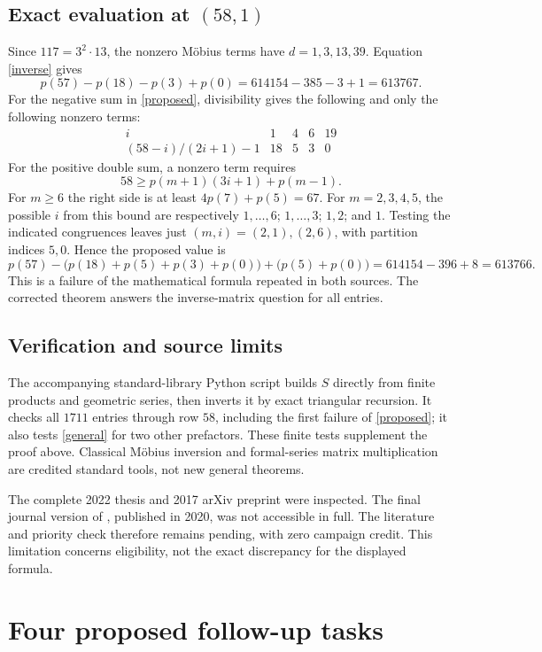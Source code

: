 \documentclass[11pt]{article}
\begin{document}
\subsection*{Exact evaluation at $(58,1)$}
Since $117=3^2\cdot13$, the nonzero M\"obius terms have
$d=1,3,13,39$. Equation \eqref{inverse} gives
\[
 p(57)-p(18)-p(3)+p(0)
 =614154-385-3+1=613767.
\]
For the negative sum in \eqref{proposed}, divisibility gives the following
and only the following nonzero terms:
\[
\begin{array}{c|rrrr}
i&1&4&6&19\\ \hline
(58-i)/(2i+1)-1&18&5&3&0
\end{array}
\]
For the positive double sum, a nonzero term requires
\[
58\geq p(m+1)(3i+1)+p(m-1).
\]
For $m\geq6$ the right side is at least $4p(7)+p(5)=67$.
For $m=2,3,4,5$, the possible $i$ from this bound are respectively
$1,\ldots,6$; $1,\ldots,3$; $1,2$; and $1$.
Testing the indicated congruences leaves just $(m,i)=(2,1),(2,6)$,
with partition indices $5,0$. Hence the proposed value is
\[
 p(57)-\bigl(p(18)+p(5)+p(3)+p(0)\bigr)
       +\bigl(p(5)+p(0)\bigr)
 =614154-396+8=613766.
\]
This is a failure of the mathematical formula repeated in both sources.
The corrected theorem answers the inverse-matrix question for all entries.

\subsection*{Verification and source limits}
The accompanying standard-library Python script builds $S$ directly from
finite products and geometric series, then inverts it by exact triangular
recursion. It checks all $1711$ entries through row $58$, including the
first failure of \eqref{proposed}; it also tests \eqref{general} for two
other prefactors. These finite tests supplement the proof above.
Classical M\"obius inversion and formal-series matrix multiplication are
credited standard tools, not new general theorems.

The complete 2022 thesis and 2017 arXiv preprint were inspected.
The final journal version of \cite{preprint}, published in 2020,
was not accessible in full. The literature and priority check therefore
remains pending, with zero campaign credit. This limitation concerns
eligibility, not the exact discrepancy for the displayed formula.

\section*{Four proposed follow-up tasks}
\end{document}
